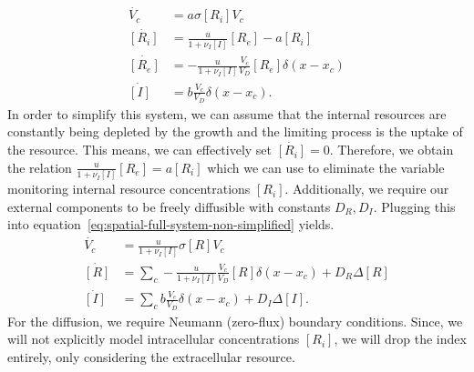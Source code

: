 \documentclass[10pt,twocolumn,5p]{elsarticle}
\numberwithin{equation}{section}
\begin{document}
\begin{align}
    \dot{V_c} &= a\sigma [R_i] V_c\\
    \dot{[R_i]} &= \frac{u}{1+\nu_I [I]} [R_e] - a[R_i]\\
    \dot{[R_e]} &= -\frac{u}{1+\nu_I [I]} \frac{V_c}{V_D} [R_e] \delta(x-x_c)\\
    \dot{[I]} &= b\frac{V_c}{V_D}\delta(x-x_c).
    \label{eq:spatial-full-system-non-simplified}
\end{align}
In order to simplify this system, we can assume that the internal resources are constantly being depleted by the growth and the limiting process is the uptake of the resource.
This means, we can effectively set $\dot{[R_i]}=0$.
Therefore, we obtain the relation $\frac{u}{1+\nu_I [I]}[R_e] = a[R_i]$ which we can use to eliminate the variable monitoring internal resource concentrations $[R_i]$.
Additionally, we require our external components to be freely diffusible with constants $D_R,D_I$.
Plugging this into equation~\eqref{eq:spatial-full-system-non-simplified} yields.
\begin{align}
    \dot{V_c} &= \frac{u}{1+\nu_I [I]} \sigma [R]V_c\\
    \dot{[R]} &= \sum\limits_c -\frac{u}{1+\nu_I [I]} \frac{V_c}{V_D} [R] \delta(x-x_c) + D_R\Delta [R]\\
    \dot{[I]} &= \sum\limits_c b\frac{V_c}{V_D}\delta(x-x_c) + D_I\Delta [I].
    \label{eq:spatial-full-system-simplified}
\end{align}
For the diffusion, we require Neumann (zero-flux) boundary conditions.
Since, we will not explicitly model intracellular concentrations $[R_i]$, we will drop the index entirely, only considering the extracellular resource.
%
%
\end{document}
